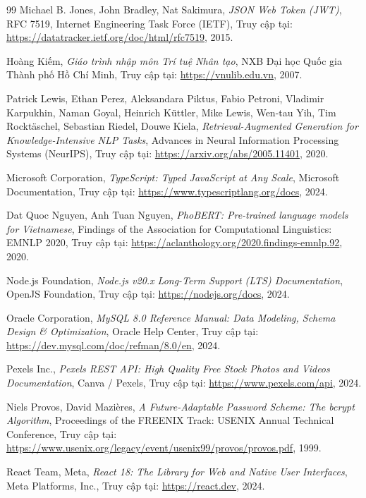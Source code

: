 \begin{thebibliography}{99}
Michael B. Jones, John Bradley, Nat Sakimura, \textit{JSON Web Token (JWT)}, RFC 7519, Internet Engineering Task Force (IETF), Truy cập tại: \url{https://datatracker.ietf.org/doc/html/rfc7519}, 2015.

Hoàng Kiếm, \textit{Giáo trình nhập môn Trí tuệ Nhân tạo}, NXB Đại học Quốc gia Thành phố Hồ Chí Minh, Truy cập tại: \url{https://vnulib.edu.vn}, 2007.

Patrick Lewis, Ethan Perez, Aleksandara Piktus, Fabio Petroni, Vladimir Karpukhin, Naman Goyal, Heinrich Küttler, Mike Lewis, Wen-tau Yih, Tim Rocktäschel, Sebastian Riedel, Douwe Kiela, \textit{Retrieval-Augmented Generation for Knowledge-Intensive NLP Tasks}, Advances in Neural Information Processing Systems (NeurIPS), Truy cập tại: \url{https://arxiv.org/abs/2005.11401}, 2020.

Microsoft Corporation, \textit{TypeScript: Typed JavaScript at Any Scale}, Microsoft Documentation, Truy cập tại: \url{https://www.typescriptlang.org/docs}, 2024.

Dat Quoc Nguyen, Anh Tuan Nguyen, \textit{PhoBERT: Pre-trained language models for Vietnamese}, Findings of the Association for Computational Linguistics: EMNLP 2020, Truy cập tại: \url{https://aclanthology.org/2020.findings-emnlp.92}, 2020.

Node.js Foundation, \textit{Node.js v20.x Long-Term Support (LTS) Documentation}, OpenJS Foundation, Truy cập tại: \url{https://nodejs.org/docs}, 2024.

Oracle Corporation, \textit{MySQL 8.0 Reference Manual: Data Modeling, Schema Design \& Optimization}, Oracle Help Center, Truy cập tại: \url{https://dev.mysql.com/doc/refman/8.0/en}, 2024.

Pexels Inc., \textit{Pexels REST API: High Quality Free Stock Photos and Videos Documentation}, Canva / Pexels, Truy cập tại: \url{https://www.pexels.com/api}, 2024.

Niels Provos, David Mazières, \textit{A Future-Adaptable Password Scheme: The bcrypt Algorithm}, Proceedings of the FREENIX Track: USENIX Annual Technical Conference, Truy cập tại: \url{https://www.usenix.org/legacy/event/usenix99/provos/provos.pdf}, 1999.

React Team, Meta, \textit{React 18: The Library for Web and Native User Interfaces}, Meta Platforms, Inc., Truy cập tại: \url{https://react.dev}, 2024.


\end{thebibliography}
